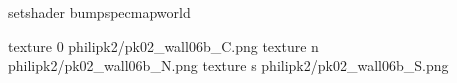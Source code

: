 setshader bumpspecmapworld

texture 0 philipk2/pk02_wall06b_C.png
texture n philipk2/pk02_wall06b_N.png
texture s philipk2/pk02_wall06b_S.png

